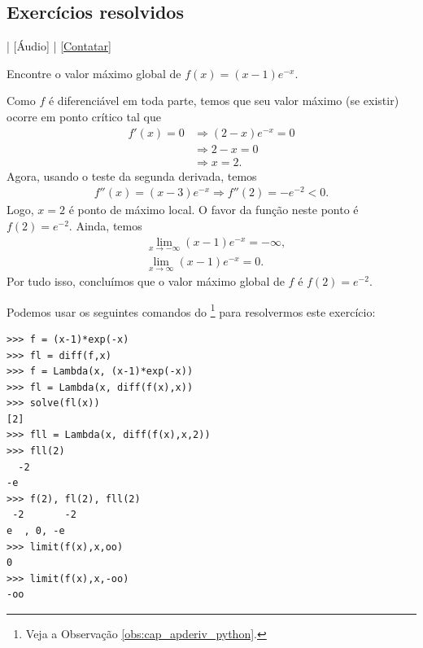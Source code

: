 \subsection*{Exercícios resolvidos}

\begin{flushright}
  [Vídeo] | [Áudio] | \href{https://phkonzen.github.io/notas/contato.html}{[Contatar]}
\end{flushright}

\begin{exeresol}
  Encontre o valor máximo global de $f(x) = (x-1)e^{-x}$.
\end{exeresol}
\begin{resol}
  Como $f$ é diferenciável em toda parte, temos que seu valor máximo (se existir) ocorre em ponto crítico tal que
  \begin{align}
    f'(x) = 0 &\Rightarrow (2-x)e^{-x} = 0 \\
              &\Rightarrow 2-x = 0 \\
              &\Rightarrow x = 2.
  \end{align}
  Agora, usando o teste da segunda derivada, temos
  \begin{align}
    f''(x) = (x-3)e^{-x} \Rightarrow f''(2) = -e^{-2} < 0.
  \end{align}
  Logo, $x=2$ é ponto de máximo local. O favor da função neste ponto é $f(2) = e^{-2}$. Ainda, temos
  \begin{align}
    &\lim_{x\to -\infty} (x-1)e^{-x} = -\infty, \\
    &\lim_{x\to \infty} (x-1)e^{-x} = 0.
  \end{align}
  Por tudo isso, concluímos que o valor máximo global de $f$ é $f(2) = e^{-2}$.

  \ifispython
  Podemos usar os seguintes comandos do \sympy\footnote{Veja a Observação \ref{obs:cap_apderiv_python}.} para resolvermos este exercício:
\begin{verbatim}
>>> f = (x-1)*exp(-x)
>>> fl = diff(f,x)
>>> f = Lambda(x, (x-1)*exp(-x))
>>> fl = Lambda(x, diff(f(x),x))
>>> solve(fl(x))
[2]
>>> fll = Lambda(x, diff(f(x),x,2))
>>> fll(2)
  -2
-e  
>>> f(2), fl(2), fll(2)
 -2       -2
e  , 0, -e  
>>> limit(f(x),x,oo)
0
>>> limit(f(x),x,-oo)
-oo
\end{verbatim}
  \fi
\end{resol}

